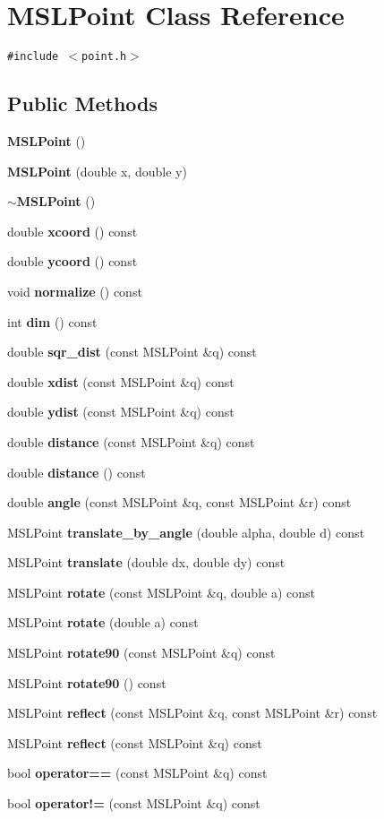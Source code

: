 \section{MSLPoint  Class Reference}
\label{class_MSLPoint}
{\tt \#include $<$point.h$>$}

\subsection*{Public Methods}
\begin{CompactItemize}
\item 
{\bf MSLPoint} ()
\item 
{\bf MSLPoint} (double x, double y)
\item 
{\bf $\sim$MSLPoint} ()
\item 
double {\bf xcoord} () const
\item 
double {\bf ycoord} () const
\item 
void {\bf normalize} () const
\item 
int {\bf dim} () const
\item 
double {\bf sqr\_\-dist} (const MSLPoint \&q) const
\item 
double {\bf xdist} (const MSLPoint \&q) const
\item 
double {\bf ydist} (const MSLPoint \&q) const
\item 
double {\bf distance} (const MSLPoint \&q) const
\item 
double {\bf distance} () const
\item 
double {\bf angle} (const MSLPoint \&q, const MSLPoint \&r) const
\item 
MSLPoint {\bf translate\_\-by\_\-angle} (double alpha, double d) const
\item 
MSLPoint {\bf translate} (double dx, double dy) const
\item 
MSLPoint {\bf rotate} (const MSLPoint \&q, double a) const
\item 
MSLPoint {\bf rotate} (double a) const
\item 
MSLPoint {\bf rotate90} (const MSLPoint \&q) const
\item 
MSLPoint {\bf rotate90} () const
\item 
MSLPoint {\bf reflect} (const MSLPoint \&q, const MSLPoint \&r) const
\item 
MSLPoint {\bf reflect} (const MSLPoint \&q) const
\item 
bool {\bf operator==} (const MSLPoint \&q) const
\item 
bool {\bf operator!=} (const MSLPoint \&q) const
\end{CompactItemize}

